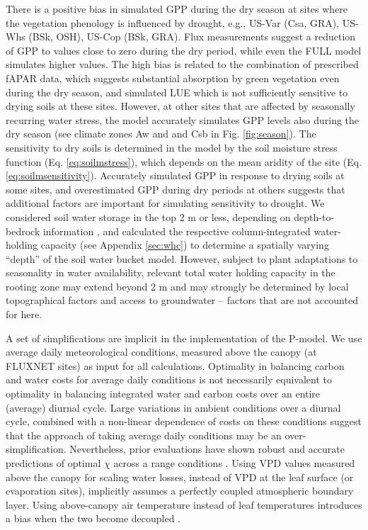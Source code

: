 \documentclass[gmd, manuscript]{copernicus}
\begin{document}
There is a positive bias in simulated GPP during the dry season at sites where the vegetation phenology is influenced by drought, e.g., US-Var (Csa, GRA), US-Whs (BSk, OSH), US-Cop (BSk, GRA). Flux measurements suggest a reduction of GPP to values close to zero during the dry period, while even the FULL model simulates higher values. The high bias is related to the combination of prescribed fAPAR data, which suggests substantial absorption by green vegetation even during the dry season, and simulated LUE which is not sufficiently sensitive to drying soils at these sites. However, at other sites that are affected by seasonally recurring water stress, the model accurately simulates GPP levels also during the dry season (see climate zones Aw and and Csb in Fig. \ref{fig:season}). The sensitivity to dry soils is determined in the model by the soil moisture stress function (Eq. \ref{eq:soilmstress}), which depends on the mean aridity of the site (Eq. \ref{eq:soilmsensitivity}). Accurately simulated GPP in response to drying soils at some sites, and overestimated GPP during dry periods at others suggests that additional factors are important for simulating sensitivity to drought. We considered soil water storage in the top 2 m or less, depending on depth-to-bedrock information \citep{Hengl2014-jm}, and calculated the respective column-integrated water-holding capacity (see Appendix \ref{sec:whc}) to determine a spatially varying ``depth'' of the soil water bucket model. However, subject to plant adaptations to seasonality in water availability, relevant total water holding capacity in the rooting zone may extend beyond 2 m  \citep{yang16wrr} and may strongly be determined by local topographical factors and access to groundwater \citep{fan13sci, fan17pnas} -- factors that are not accounted for here.

A set of simplifications are implicit in the implementation of the P-model. We use average daily meteorological conditions, measured above the canopy (at FLUXNET sites) as input for all calculations. Optimality in balancing carbon and water costs for average daily conditions is not necessarily equivalent to optimality in balancing integrated water and carbon costs over an entire (average) diurnal cycle. Large variations in ambient conditions over a diurnal cycle, combined with a non-linear dependence of costs on these conditions suggest that the approach of taking average daily conditions may be an over-simplification. Nevertheless, prior evaluations have shown robust and accurate predictions of optimal $\chi$ across a range conditions \citep{wang17natpl}. Using VPD values measured above the canopy for scaling water losses, instead of VPD at the leaf surface (or evaporation sites), implicitly assumes a perfectly coupled atmospheric boundary layer. Using above-canopy air temperature instead of leaf temperatures introduces a bias when the two become decoupled \citep{michaletz15tee}. %
\end{document}
